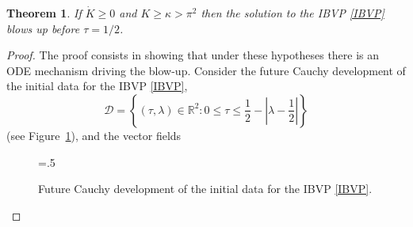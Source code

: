 \documentclass[10pt]{amsart}
\newcommand{\bbR}{\mathbb{R}}      %
\newtheorem{Thm}{Theorem}[section]
\begin{document}
\begin{Thm} \label{blowupThm}
If $\dot{K} \geq 0$ and $K \geq \kappa > \pi^2$ then the solution to the IBVP \eqref{IBVP} blows up before $\tau=1/2$.
\end{Thm}

\begin{proof}
The proof consists in showing that under these hypotheses there is an ODE mechanism driving the blow-up. Consider the future Cauchy development of the initial data for the IBVP \eqref{IBVP},
\begin{equation}
\mathcal{D} = \left\{ (\tau,\lambda) \in \bbR^2 : 0 \leq \tau \leq \frac12 - \left|\lambda-\frac12\right| \right\}
\end{equation}
(see Figure~\ref{Domain}), and the vector fields

\begin{figure}[h!]
\begin{center}
\epsfxsize=.5\textwidth
\leavevmode
{}
\end{center}
\caption{Future Cauchy development of the initial data for the IBVP \eqref{IBVP}.} \label{Domain}
\end{figure}


\end{proof}
\end{document}
